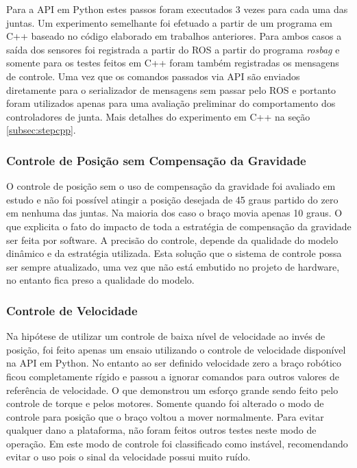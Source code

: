 Para a API em Python estes passos foram executados 3 vezes para cada uma das juntas. Um experimento semelhante foi efetuado a partir de um programa em C++ baseado no código elaborado em trabalhos anteriores. Para ambos casos a saída dos sensores foi registrada a partir do ROS a partir do programa \textit{rosbag} e somente para os testes feitos em C++ foram também registradas os mensagens de controle. Uma vez que os comandos passados via API são enviados diretamente para o serializador de mensagens sem passar pelo ROS e portanto foram utilizados apenas para uma avaliação preliminar do comportamento dos controladores de junta. Mais detalhes do experimento em C++ na seção \ref{subsec:stepcpp}. 


\subsubsection{Controle de Posição sem Compensação da Gravidade}

O controle de posição sem o uso de compensação da gravidade foi avaliado em estudo e não foi possível atingir a posição desejada de 45 graus partido do zero em nenhuma das juntas. Na maioria dos caso o braço movia apenas 10 graus. O que explicita o fato do impacto de toda a estratégia de compensação da gravidade ser feita por software. A precisão do controle, depende da qualidade do modelo dinâmico e da estratégia utilizada. Esta solução que o sistema de controle possa ser sempre atualizado, uma vez que não está embutido no projeto de hardware, no entanto fica preso a qualidade do modelo.

\subsubsection{Controle de Velocidade}

Na hipótese de utilizar um controle de baixa nível de velocidade ao invés de posição, foi feito apenas um ensaio utilizando o controle de velocidade disponível na API em Python. No entanto ao ser definido velocidade zero a braço robótico ficou completamente rígido e passou a ignorar comandos para outros valores de referência de velocidade. O que demonstrou um esforço grande sendo feito pelo controle de torque e pelos motores. Somente quando foi alterado o modo de controle para posição que o braço voltou a mover normalmente. Para evitar qualquer dano a plataforma, não foram feitos outros testes neste modo de operação. Em \cite{mekartfd} este modo de controle foi classificado como instável, recomendando evitar o uso pois o sinal da velocidade possui muito ruído.

